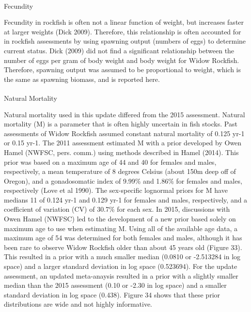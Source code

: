\documentclass[
]{scrartcl}
\makeatletter
\let\oldparagraph\paragraph
\renewcommand{\paragraph}{
    \@ifstar
      \xxxParagraphStar
      \xxxParagraphNoStar
  }
\newcommand{\xxxParagraphStar}[1]{\oldparagraph*{#1}\mbox{}}
\newcommand{\xxxParagraphNoStar}[1]{\oldparagraph{#1}\mbox{}}
\makeatother
\begin{document}
\paragraph{Fecundity}\label{fecundity}

Fecundity in rockfish is often not a linear function of weight, but
increases faster at larger weights (Dick 2009). Therefore, this
relationship is often accounted for in rockfish assessments by using
spawning output (numbers of eggs) to determine current status. Dick
(2009) did not find a significant relationship between the number of
eggs per gram of body weight and body weight for Widow Rockfish.
Therefore, spawning output was assumed to be proportional to weight,
which is the same as spawning biomass, and is reported here.

\paragraph{Natural Mortality}\label{natural-mortality}

Natural mortality used in this update differed from the 2015 assessment.
Natural mortality (M) is a parameter that is often highly uncertain in
fish stocks. Past assessments of Widow Rockfish assumed constant natural
mortality of 0.125 yr-1 or 0.15 yr-1. The 2011 assessment estimated M
with a prior developed by Owen Hamel (NWFSC, pers. comm.) using methods
described in Hamel (2014). This prior was based on a maximum age of 44
and 40 for females and males, respectively, a mean temperature of 8
degrees Celsius (about 150m deep off of Oregon), and a gonadosomatic
index of 9.99\% and 1.86\% for females and males, respectively (Love et
al 1990). The sex-specific lognormal priors for M have medians 11 of
0.124 yr-1 and 0.129 yr-1 for females and males, respectively, and a
coefficient of variation (CV) of 30.7\% for each sex. In 2015,
discussions with Owen Hamel (NWFSC) led to the development of a new
prior based solely on maximum age to use when estimating M. Using all of
the available age data, a maximum age of 54 was determined for both
females and males, although it has been rare to observe Widow Rockfish
older than about 45 years old (Figure 33). This resulted in a prior with
a much smaller median (0.0810 or -2.513284 in log space) and a larger
standard deviation in log space (0.523694). For the update assessment,
an updated meta-anaysis resulted in a prior with a slightly smaller
median than the 2015 assessment (0.10 or -2.30 in log space) and a
smaller standard deviation in log space (0.438). Figure 34 shows that
these prior distributions are wide and not highly informative.
\end{document}
